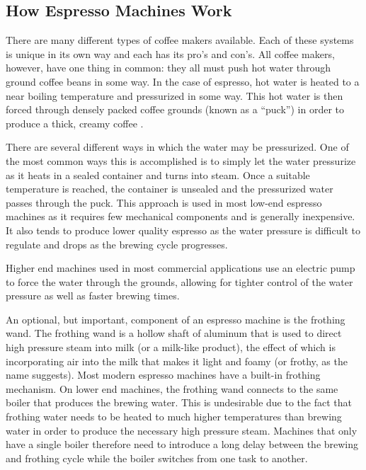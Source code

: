 \documentclass[conference]{IEEEtran}
\begin{document}
\subsection{How Espresso Machines Work}

There are many different types of coffee makers available. Each of these systems
is unique in its own way and each has its pro's and con's. All coffee makers,
however, have one thing in common: they all must push hot water through ground
coffee beans in some way. In the case of espresso, hot water is heated to a near
boiling temperature and pressurized in some way. This hot water is then forced
through densely packed coffee grounds (known as a ``puck'') in order to produce
a thick, creamy coffee \cite{wikiespresso}.  

There are several different ways in which the water may be pressurized. One of
the most common ways this is accomplished is to simply let the water pressurize
as it heats in a sealed container and turns into steam. Once a suitable
temperature is reached, the container is unsealed and the pressurized water
passes through the puck. This approach is used in most low-end espresso machines
as it requires few mechanical components and is generally inexpensive. It also
tends to produce lower quality espresso as the water pressure is difficult to
regulate and drops as the brewing cycle progresses.

Higher end machines used in most commercial applications use an electric pump to
force the water through the grounds, allowing for tighter control of the
water pressure as well as faster brewing times.

An optional, but important, component of an espresso machine is the frothing
wand. The frothing wand is a hollow shaft of aluminum that is used to direct
high pressure steam into milk (or a milk-like product), the effect of which is
incorporating air into the milk that makes it light and foamy (or frothy, as
the name suggests). Most modern espresso machines have a built-in frothing
mechanism. On lower end machines, the frothing wand connects to the same boiler
that produces the brewing water. This is undesirable due to the fact that
frothing water needs to be heated to much higher temperatures than brewing water
in order to produce the necessary high pressure steam. Machines that only have a
single boiler therefore need to introduce a long delay between the brewing and
frothing cycle while the boiler switches from one task to another.
\end{document}
